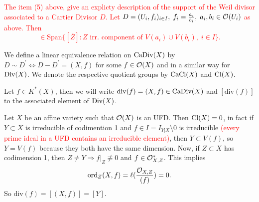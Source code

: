 \begin{remark}
    \textcolor{red}{The item (5) above, give an explicty description of the support of the Weil divisor associated 
    to a Cartier Divisor $D$. Let $D=(U_i,f_i)_{i\in I},\;f_i=\tfrac{a_i}{b_i},\;a_i,b_i\in\mathcal{O}(U_i)$ as above. Then 
    \begin{equation}
        [D]\in\text{Span}\{[\overline{Z}]: Z\text{ irr. component of }V(a_i)\cup V(b_i),\;i\in I\}.
    \end{equation}
    }
\end{remark} 

\begin{dang}
    \begin{definition}
        We define a linear equivalence relation on $\text{CaDiv}(X)$ 
        by $D\sim D^\prime\iff D-D^\prime = (X,f)$ for some $f\in\mathcal{O}(X)$ and 
        in a similar way for $\text{Div}(X)$. We denote the respective quotient groups by 
        $\text{CaCl}(X)$ and $\text{Cl}(X)$.  
    \end{definition}
\end{dang}

\begin{notation}
    Let $f\in K^*(X)$, then we will write $\text{div}(f) = (X,f)\in\text{CaDiv}(X)$ and 
    $[\text{div}(f)]$ to the associated element of $\text{Div}(X)$.
\end{notation}

\begin{example}\label{example: coordinate ring of X if UFD implies cl(X) zero}
     Let $X$ be an affine variety such that $\mathcal{O}(X)$ is an UFD. Then $\text{Cl}(X)=0$, in fact if 
     $Y\subset X$ is irreducible of codimention 1 and $f\in I= I_{Y|X}\setminus0$ is irreducible 
     \textcolor{red}{(every prime ideal in a UFD contains an irreducible element)}, then 
     $Y\subset V(f)$, so $Y=V(f)$ because they both have the same dimension. Now, if $Z\subset X$ has codimension 1, then 
     $Z\neq Y\Rightarrow f|_Z\not\equiv0$ and $f\in\mathcal{O}_{X,Z}^*$. This implies 
     \begin{equation}
       \text{ord}_Z(X,f) = \ell(\frac{\mathcal{O}_{X,Z}}{(f)}) = 0.
     \end{equation}
     So $\text{div}(f)=[(X,f)] = [Y]$. 
\end{example}


